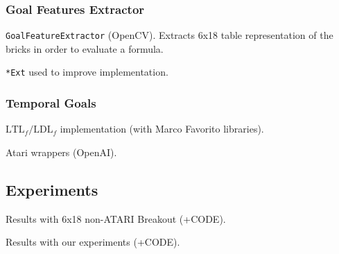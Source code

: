 \subsubsection{Goal Features Extractor}
\texttt{GoalFeatureExtractor} (OpenCV). Extracts 6x18 table representation
of the bricks in order to evaluate a formula.


\texttt{*Ext} used to improve implementation.

\subsubsection{Temporal Goals}
$\text{LTL}_f/\text{LDL}_f$ implementation (with Marco Favorito libraries).


Atari wrappers (OpenAI).

\subsection{Experiments}
\label{subsec:experiments}
Results with 6x18 non-ATARI Breakout (+CODE).

Results with our experiments (+CODE).
